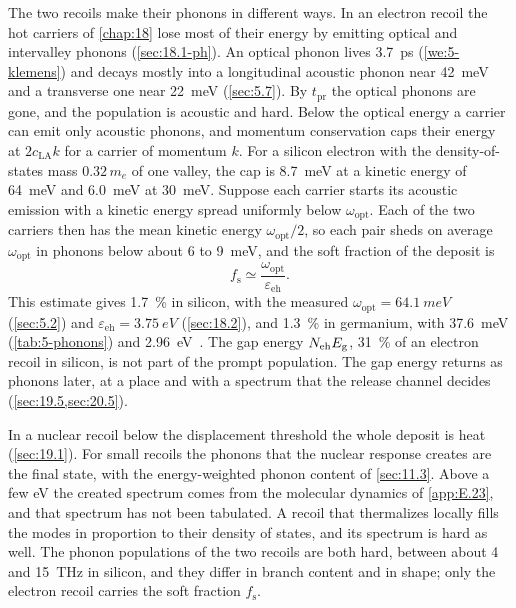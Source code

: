 The two recoils make their phonons in different ways. In an electron recoil the hot carriers of \cref{chap:18} lose most of their energy by emitting optical and intervalley phonons (\cref{sec:18.1-ph}). An optical phonon lives \SI{3.7}{ps} (\cref{we:5-klemens}) and decays mostly into a longitudinal acoustic phonon near \SI{42}{meV} and a transverse one near \SI{22}{meV} (\cref{sec:5.7}). By $t_{\mathrm{pr}}$ the optical phonons are gone, and the population is acoustic and hard. Below the optical energy a carrier can emit only acoustic phonons, and momentum conservation caps their energy at $2c_{\mathrm{LA}}k$ for a carrier of momentum $k$. For a silicon electron with the density-of-states mass $0.32\,m_e$ of one valley, the cap is \SI{8.7}{meV} at a kinetic energy of \SI{64}{meV} and \SI{6.0}{meV} at \SI{30}{meV}. Suppose each carrier starts its acoustic emission with a kinetic energy spread uniformly below $\omega_{\mathrm{opt}}$. Each of the two carriers then has the mean kinetic energy $\omega_{\mathrm{opt}}/2$, so each pair sheds on average $\omega_{\mathrm{opt}}$ in phonons below about 6 to \SI{9}{meV}, and the soft fraction of the deposit is
\begin{equation}
  f_{\mathrm{s}} \simeq \frac{\omega_{\mathrm{opt}}}{\varepsilon_{\mathrm{eh}}} .
  \label{eq:20.2-fs}
\end{equation}
This estimate gives \SI{1.7}{\percent} in silicon, with the measured $\omega_{\mathrm{opt}} = \SI{64.1}{meV}$ (\cref{sec:5.2}) and $\varepsilon_{\mathrm{eh}} = \SI{3.75}{eV}$ (\cref{sec:18.2}), and \SI{1.3}{\percent} in germanium, with \SI{37.6}{meV} (\cref{tab:5-phonons}) and \SI{2.96}{eV}~\cite[Table~I]{leman2012invited}. The gap energy $N_{\mathrm{eh}}E_{\mathrm{g}}$, \SI{31}{\percent} of an electron recoil in silicon, is not part of the prompt population. The gap energy returns as phonons later, at a place and with a spectrum that the release channel decides (\cref{sec:19.5,sec:20.5}).

In a nuclear recoil below the displacement threshold the whole deposit is heat (\cref{sec:19.1}). For small recoils the phonons that the nuclear response creates are the final state, with the energy-weighted phonon content of \cref{sec:11.3}. Above a few eV the created spectrum comes from the molecular dynamics of \cref{app:E.23}, and that spectrum has not been tabulated. A recoil that thermalizes locally fills the modes in proportion to their density of states, and its spectrum is hard as well. The phonon populations of the two recoils are both hard, between about 4 and \SI{15}{THz} in silicon, and they differ in branch content and in shape; only the electron recoil carries the soft fraction $f_{\mathrm{s}}$.


